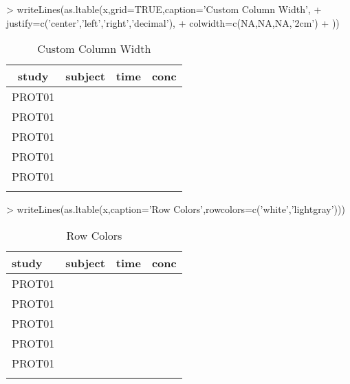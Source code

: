 \documentclass[titlepage]{article}
\begin{document}
\begin{Schunk}
\begin{Sinput}
> writeLines(as.ltable(x,grid=TRUE,caption='Custom Column Width',
+     justify=c('center','left','right','decimal'),
+     colwidth=c(NA,NA,NA,'2cm')
+ ))
\end{Sinput}
\begin{table}[H]
 \caption[Custom Column Width]{Custom Column Width }
 \begin{center}
  \begin{tabular}{c|l|r|p{2cm}}
    \hline \hline
   study & subject & time & conc \\ \hline
   PROT01 & \verb#1001# & \verb#0# & \verb#0.12# \\ \hline
   PROT01 & \verb#1001# & \verb#1# & \verb#34   # \\ \hline
   PROT01 & \verb#1001# & \verb#2# & \verb#5.6 # \\ \hline
   PROT01 & \verb#1002# & \verb#0# & \verb#0.5 # \\ \hline
   PROT01 & \verb#1002# & \verb#1# & \verb#200   # \\ \hline
    & \verb#1002# & \verb#2# & \verb## \\ \hline
  \end{tabular}
 \end{center}
\end{table}\end{Schunk}
\begin{Schunk}
\begin{Sinput}
> writeLines(as.ltable(x,caption='Row Colors',rowcolors=c('white','lightgray')))
\end{Sinput}
\begin{table}[H]
 \caption[Row Colors]{Row Colors }
 \begin{center}
  \begin{tabular}{lrrr}
    \hline \hline
   study & subject & time & conc \\ \hline
   \rowcolor{white} PROT01 & \verb#1001# & \verb#0# & \verb#0.12# \\
   \rowcolor{lightgray} PROT01 & \verb#1001# & \verb#1# & \verb#34.00# \\
   \rowcolor{white} PROT01 & \verb#1001# & \verb#2# & \verb#5.60# \\
   \rowcolor{lightgray} PROT01 & \verb#1002# & \verb#0# & \verb#0.50# \\
   \rowcolor{white} PROT01 & \verb#1002# & \verb#1# & \verb#200.00# \\
   \rowcolor{lightgray}  & \verb#1002# & \verb#2# & \verb## \\ \hline
  \end{tabular}
 \end{center}
\end{table}\end{Schunk}
\end{document}
